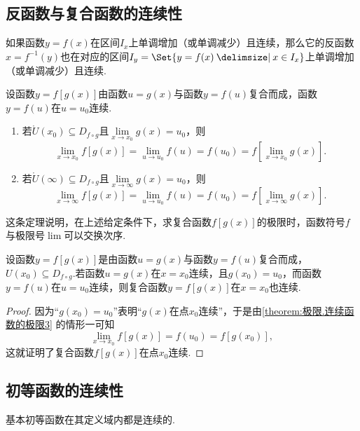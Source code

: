 \subsection{反函数与复合函数的连续性}
\begin{theorem}\label{theorem:极限.连续函数的极限2}
如果函数\(y = f(x)\)在区间\(I_x\)上单调增加（或单调减少）且连续，那么它的反函数\(x = f^{-1}(y)\)也在对应的区间\(I_y = \Set{ y = f(x) \given x \in I_x }\)上单调增加（或单调减少）且连续.
\end{theorem}

\begin{theorem}\label{theorem:极限.连续函数的极限3}
\def\D{D_{f \circ g}}
设函数\(y = f[g(x)]\)由函数\(u = g(x)\)与函数\(y = f(u)\)复合而成，函数\(y = f(u)\)在\(u = u_0\)连续.
\begin{enumerate}
\item 若\(\mathring{U}(x_0) \subseteq \D\)且\(\lim\limits_{x \to x_0}g(x) = u_0\)，则\[
\lim\limits_{x \to x_0}f[g(x)]
= \lim\limits_{u \to u_0}f(u) = f(u_0)
= f\left[ \lim\limits_{x \to x_0} g(x) \right].
\]

\item 若\(\mathring{U}(\infty) \subseteq \D\)且\(\lim\limits_{x\to\infty}g(x) = u_0\)，则\[
\lim\limits_{x \to \infty}f[g(x)]
= \lim\limits_{u \to u_0}f(u) = f(u_0)
= f\left[ \lim\limits_{x \to \infty} g(x) \right].
\]
\end{enumerate}
\end{theorem}
这条定理说明，在上述给定条件下，求复合函数\(f[g(x)]\)的极限时，函数符号\(f\)与极限号\(\lim\)可以交换次序.

\begin{theorem}\label{theorem:极限.连续函数的极限4}
设函数\(y = f[g(x)]\)是由函数\(u = g(x)\)与函数\(y = f(u)\)复合而成，\(U(x_0) \subseteq D_{f \circ g}\).若函数\(u = g(x)\)在\(x = x_0\)连续，且\(g(x_0) = u_0\)，而函数\(y = f(u)\)在\(u = u_0\)连续，则复合函数\(y = f[g(x)]\)在\(x = x_0\)也连续.
\begin{proof}
因为“\(g(x_0) = u_0\)”表明“\(g(x)\)在点\(x_0\)连续”，于是由\cref{theorem:极限.连续函数的极限3} 的情形一可知\[
\lim\limits_{x \to x_0}f[g(x)]
= f(u_0) = f[g(x_0)],
\]这就证明了复合函数\(f[g(x)]\)在点\(x_0\)连续.
\end{proof}
\end{theorem}

\subsection{初等函数的连续性}
\begin{theorem}\label{theorem:极限.连续函数的极限5}
基本初等函数在其定义域内都是连续的.
\end{theorem}

